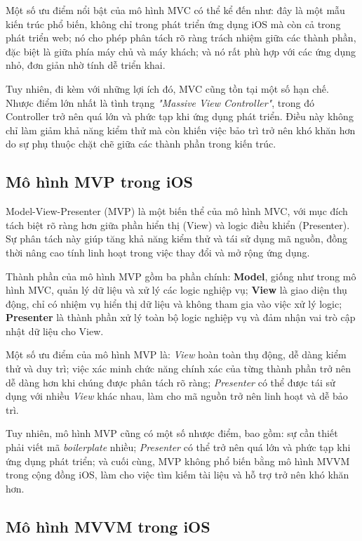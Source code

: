   Một số ưu điểm nổi bật của mô hình MVC có thể kể đến như: đây là một mẫu kiến trúc phổ biến, không chỉ trong phát triển ứng dụng iOS mà còn cả trong phát triển web; nó cho phép phân tách rõ ràng trách nhiệm giữa các thành phần, đặc biệt là giữa phía máy chủ và máy khách; và nó rất phù hợp với các ứng dụng nhỏ, đơn giản nhờ tính dễ triển khai.

  Tuy nhiên, đi kèm với những lợi ích đó, MVC cũng tồn tại một số hạn chế. Nhược điểm lớn nhất là tình trạng \textit{"Massive View Controller"}, trong đó Controller trở nên quá lớn và phức tạp khi ứng dụng phát triển. Điều này không chỉ làm giảm khả năng kiểm thử mà còn khiến việc bảo trì trở nên khó khăn hơn do sự phụ thuộc chặt chẽ giữa các thành phần trong kiến trúc.

\subsection{Mô hình MVP trong iOS}

  Model-View-Presenter (MVP) là một biến thể của mô hình MVC, với mục đích tách biệt rõ ràng hơn giữa phần hiển thị (View) và logic điều khiển (Presenter). Sự phân tách này giúp tăng khả năng kiểm thử và tái sử dụng mã nguồn, đồng thời nâng cao tính linh hoạt trong việc thay đổi và mở rộng ứng dụng. 

  Thành phần của mô hình MVP gồm ba phần chính: \textbf{Model}, giống như trong mô hình MVC, quản lý dữ liệu và xử lý các logic nghiệp vụ; \textbf{View} là giao diện thụ động, chỉ có nhiệm vụ hiển thị dữ liệu và không tham gia vào việc xử lý logic; \textbf{Presenter} là thành phần xử lý toàn bộ logic nghiệp vụ và đảm nhận vai trò cập nhật dữ liệu cho View.

  Một số ưu điểm của mô hình MVP là: \textit{View} hoàn toàn thụ động, dễ dàng kiểm thử và duy trì; việc xác minh chức năng chính xác của từng thành phần trở nên dễ dàng hơn khi chúng được phân tách rõ ràng; \textit{Presenter} có thể được tái sử dụng với nhiều \textit{View} khác nhau, làm cho mã nguồn trở nên linh hoạt và dễ bảo trì.

  Tuy nhiên, mô hình MVP cũng có một số nhược điểm, bao gồm: sự cần thiết phải viết mã \textit{boilerplate} nhiều; \textit{Presenter} có thể trở nên quá lớn và phức tạp khi ứng dụng phát triển; và cuối cùng, MVP không phổ biến bằng mô hình MVVM trong cộng đồng iOS, làm cho việc tìm kiếm tài liệu và hỗ trợ trở nên khó khăn hơn.

\subsection{Mô hình MVVM trong iOS}

